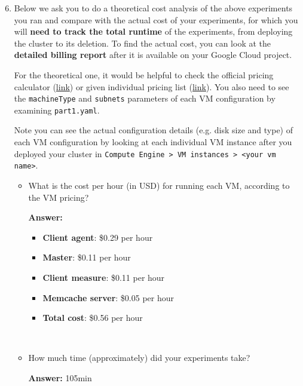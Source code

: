 \begin{enumerate}[label=(\alph*)]
    \setcounter{enumi}{5}
    
    \item Below we ask you to do a theoretical cost analysis of the above experiments you ran and compare with the actual cost of your experiments, for which you will \textbf{need to track the total runtime} of the experiments, from deploying the cluster to its deletion. To find the actual cost, you can look at the \textbf{detailed billing report} after it is available on your Google Cloud project. 

    For the theoretical one, it would be helpful to check the official pricing calculator (\href{https://cloud.google.com/products/calculator?hl=en}{link}) or given individual pricing list (\href{https://cloud.google.com/compute/all-pricing}{link}). You also need to see the \texttt{machineType} and \texttt{subnets} parameters of each VM configuration by examining \texttt{part1.yaml}. 
    
    Note you can see the actual configuration details (e.g. disk size and type) of each VM configuration by looking at each individual VM instance after you deployed your cluster in \texttt{Compute Engine > VM instances > <your vm name>}.

    \begin{itemize}
        \item What is the cost per hour (in USD) for running each VM, according to the VM pricing?

        \textbf{Answer:} %
        \begin{itemize}
            \item \textbf{Client agent}: \$0.29 per hour
            \item \textbf{Master}: \$0.11 per hour
            \item \textbf{Client measure}: \$0.11 per hour
            \item \textbf{Memcache server}: \$0.05 per hour
            \item \textbf{Total cost}: \$0.56 per hour
        \end{itemize}
        \\

        \item How much time (approximately) did your experiments take? 

        \textbf{Answer:} 105min%
        \\


\end{itemize}
\end{enumerate}
